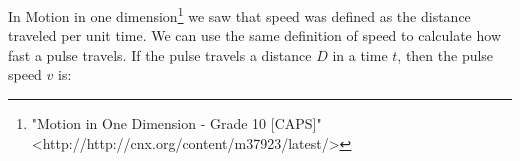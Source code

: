         \label{m38801*id313303}In Motion in one dimension\footnote{\raggedright{}"Motion in One Dimension - Grade 10 [CAPS]" <http://http://cnx.org/content/m37923/latest/>} we saw that speed was defined as the distance traveled per unit time. We can use the same definition of speed to calculate how fast a pulse travels. If the pulse travels a distance \begin{math}D\end{math} in a time \begin{math}t\end{math}, then the pulse speed \begin{math}v\end{math} is:\par 
        \label{m38801*uid4}\nopagebreak\noindent{}
    
        
\par
            \label{m38801*secfhsst!!!underscore!!!id161}\vspace{.5cm} 
      
